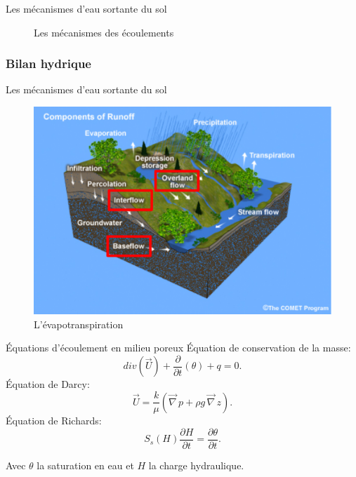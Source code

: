 \documentclass{beamer}
\numberwithin{equation}{section}
\begin{document}
\begin{frame}{Les mécanismes d'eau sortante du sol}
\begin{minipage}[b]{0.5\linewidth}
\begin{figure}
\begin{center}
						\end{center}
					\caption{Les mécanismes des écoulements}
					\end{figure} 
		\end{minipage}
	\end{frame}

	\subsubsection{Bilan hydrique}
	
	\begin{frame}{Les mécanismes d'eau sortante du sol}
		\begin{minipage}[b]{0.5\linewidth}
			\begin{figure}
				\begin{center}
					\includegraphics[scale=0.15]{different_flows.png}
				\end{center}
				\caption{L'évapotranspiration}
			\end{figure} 
		\end{minipage}\hfill
		\begin{minipage}[b]{0.5\linewidth}
			\begin{block}{Équations d'écoulement en milieu poreux}
			Équation de conservation de la masse:
			\begin{equation}
				\label{eq-mass-por}
				div(\overrightarrow{U})+\frac{\partial}{\partial t}(\theta)+ q=0.
			\end{equation}
			Équation de Darcy:
			\begin{equation}
				\label{eq-Darcy}
				\overrightarrow{U}=\frac{k}{\mu }(\overrightarrow{\nabla}\, p+\rho g \,\overrightarrow{\nabla}\, z).
			\end{equation} 
			Équation de Richards:
			\begin{equation}
				\label{eq-rapp-dens-H}
				S_s(H)\frac{\partial H}{\partial t}=\frac{\partial\theta}{\partial t}.
			\end{equation}
			\end{block}
		Avec $\theta$ la saturation en eau et $H$ la charge hydraulique.
		\end{minipage}
	\end{frame}
	
\end{document}
